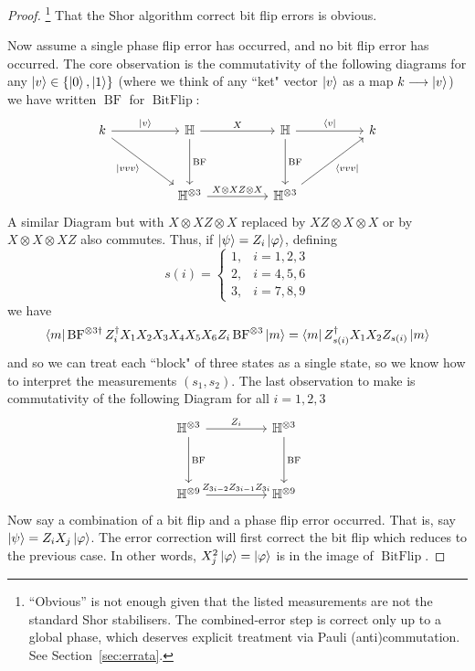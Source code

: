 \documentclass[12pt]{article}
\theoremstyle{plain}
\theoremstyle{definition}
\newcommand{\bb}[1]{\mathbb{#1}}
\newcommand{\lto}{\longrightarrow}
\begin{document}
\begin{proof}\footnote{``Obvious'' is not enough given that the listed measurements are not the standard Shor stabilisers. The combined-error step is correct only up to a global phase, which deserves explicit treatment via Pauli (anti)commutation. See Section~\ref{sec:errata}.}
That the Shor algorithm correct bit flip errors is obvious.

Now assume a single phase flip error has occurred, and no bit flip error has occurred. The core observation is the commutativity of the following diagrams for any $\ket{v} \in \lbrace \ket{0},\ket{1}\rbrace$ (where we think of any ``ket" vector $\ket{v}$ as a map $k \lto \ket{v}$) we have written $\operatorname{BF}$ for $\operatorname{BitFlip}$:
\begin{equation}
\begin{tikzcd}[column sep = huge, row sep = huge]
k\arrow[dr,swap,"{\ket{vvv}}"]\arrow[r,"{\ket{v}}"] & \bb{H}\arrow[r,"X"]\arrow[d,"{\operatorname{BF}}"] & \bb{H}\arrow[r,"{\bra{v}}"]\arrow[d,"{\operatorname{BF}}"] & k\\
& \bb{H}^{\otimes 3}\arrow[r,"{X\otimes XZ \otimes X}"] & \bb{H}^{\otimes 3}\arrow[ur,swap,"{\bra{vvv}}"]
\end{tikzcd}
\end{equation}
A similar Diagram but with $X\otimes XZ \otimes X$ replaced by $XZ\otimes X \otimes X$ or by $X\otimes X \otimes XZ$ also commutes. Thus, if $\ket{\psi} = Z_i\ket{\varphi}$, defining
\begin{equation}
s(i) =
\begin{cases}
1, & i = 1,2,3\\
2, & i=4,5,6\\
3, & i=7,8,9
\end{cases}
\end{equation}
we have
\begin{equation}
\bra{m}\operatorname{BF}^{\otimes 3\dagger}Z_i^\dagger X_1X_2X_3X_4X_5X_6 Z_i \operatorname{BF}^{\otimes 3}\ket{m} = \bra{m}Z_{s(i)}^\dagger X_1X_2Z_{s(i)}\ket{m}
\end{equation}
and so we can treat each ``block" of three states as a single state, so we know how to interpret the measurements $(s_1,s_2)$. The last observation to make is commutativity of the following Diagram for all $i=1,2,3$
\begin{equation}
\begin{tikzcd}[column sep = huge, row sep = huge]
\bb{H}^{\otimes 3}\arrow[r,"{Z_i}"]\arrow[d,"{\operatorname{BF}}"] & \bb{H}^{\otimes 3}\arrow[d,"{\operatorname{BF}}"]\\
\bb{H}^{\otimes 9}\arrow[r,"{Z_{3i-2}Z_{3i-1}Z_{3i}}"] & \bb{H}^{\otimes 9}
\end{tikzcd}
\end{equation}
Now say a combination of a bit flip and a phase flip error occurred. That is, say $\ket{\psi} = Z_iX_j\ket{\varphi}$. The error correction will first correct the bit flip which reduces to the previous case. In other words, $X_j^2 \ket{\varphi} = \ket{\varphi}$ is in the image of $\operatorname{BitFlip}$.
\end{proof}
\end{document}

